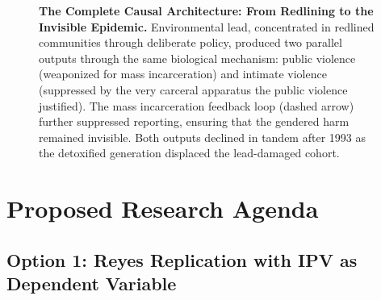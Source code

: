 \documentclass[12pt, letterpaper]{article}
\begin{document}
\begin{figure}[H]
\caption{\textbf{The Complete Causal Architecture: From Redlining to the Invisible Epidemic.} Environmental lead, concentrated in redlined communities through deliberate policy, produced two parallel outputs through the same biological mechanism: public violence (weaponized for mass incarceration) and intimate violence (suppressed by the very carceral apparatus the public violence justified). The mass incarceration feedback loop (dashed arrow) further suppressed reporting, ensuring that the gendered harm remained invisible. Both outputs declined in tandem after 1993 as the detoxified generation displaced the lead-damaged cohort.}
\label{fig:causal_chain}
\end{figure}

\section{Proposed Research Agenda}

\subsection{Option 1: Reyes Replication with IPV as Dependent Variable}
\end{document}
